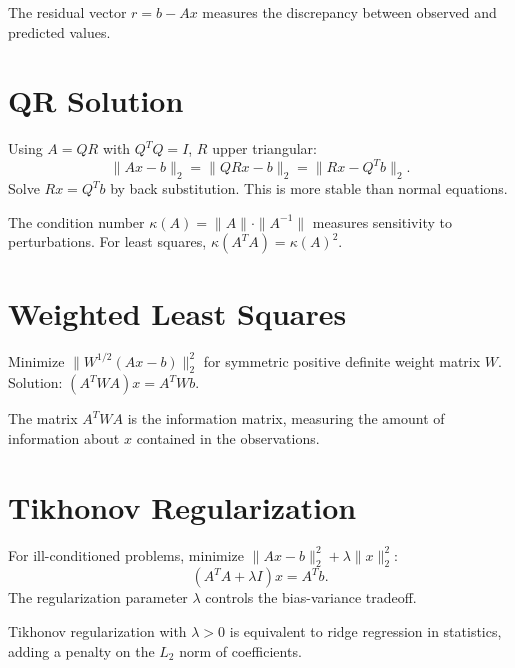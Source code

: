 \begin{definition}
The residual vector $r = b - Ax$ measures the discrepancy between observed and predicted values.
\end{definition}

\section{QR Solution}

Using $A = QR$ with $Q^T Q = I$, $R$ upper triangular:
\[
\|Ax - b\|_2 = \|QRx - b\|_2 = \|Rx - Q^T b\|_2.
\]
Solve $Rx = Q^T b$ by back substitution. This is more stable than normal equations.

\begin{definition}
The condition number $\kappa(A) = \|A\| \cdot \|A^{-1}\|$ measures sensitivity to perturbations. For least squares, $\kappa(A^TA) = \kappa(A)^2$.
\end{definition}

\section{Weighted Least Squares}

Minimize $\|W^{1/2}(Ax - b)\|_2^2$ for symmetric positive definite weight matrix $W$. Solution: $(A^T W A)x = A^T W b$.

\begin{definition}
The matrix $A^T W A$ is the information matrix, measuring the amount of information about $x$ contained in the observations.
\end{definition}

\section{Tikhonov Regularization}

For ill-conditioned problems, minimize $\|Ax - b\|_2^2 + \lambda \|x\|_2^2$:
\[
(A^T A + \lambda I)x = A^T b.
\]
The regularization parameter $\lambda$ controls the bias-variance tradeoff.

\begin{definition}
Tikhonov regularization with $\lambda > 0$ is equivalent to ridge regression in statistics, adding a penalty on the $L_2$ norm of coefficients.
\end{definition}

